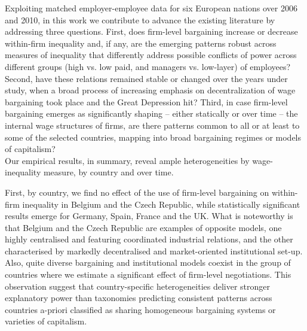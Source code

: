 \documentclass[12pt]{article}
\begin{document}
Exploiting matched employer-employee data for six European nations
over 2006 and 2010, in this work we contribute to advance the existing
literature by addressing three questions. First, does firm-level
bargaining increase or decrease within-firm inequality and, if any,
are the emerging patterns robust across measures of inequality that
differently address possible conflicts of power across different
groups (high vs. low paid, and managers vs. low-layer) of employees?
Second, have these relations remained stable or changed over the years
under study, when a broad process of increasing emphasis on
decentralization of wage bargaining took place and the Great
Depression hit? Third, in case firm-level bargaining emerges as
significantly shaping -- either statically or over time -- the
internal wage structures of firms, are there patterns common to all or
at least to some of the selected countries, mapping into broad
bargaining regimes or models of capitalism?\\

Our empirical results, in summary, reveal ample heterogeneities by
wage-inequality measure, by country and over time.

First, by country, we find no effect of the use of firm-level
bargaining on within-firm inequality in Belgium and the Czech
Republic, while statistically significant results emerge for Germany,
Spain, France and the UK. What is noteworthy is that Belgium and the
Czech Republic are examples of opposite models, one highly centralised
and featuring coordinated industrial relations, and the other
characterised by markedly decentralised and market-oriented
institutional set-up. Also, quite diverse bargaining and institutional
models coexist in the group of countries where we estimate a
significant effect of firm-level negotiations. This observation
suggest that country-specific heterogeneities deliver stronger
explanatory power than taxonomies predicting consistent patterns
across countries a-priori classified as sharing homogeneous bargaining
systems or varieties of capitalism.
\end{document}
